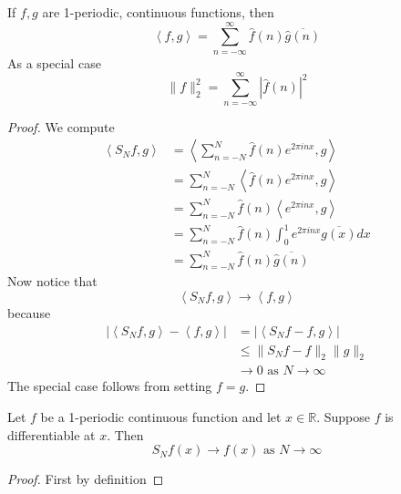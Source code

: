 \documentclass[11pt]{article}
\numberwithin{equation}{section}
\theoremstyle{definition}
\theoremstyle{definition}
\newcommand\angles[1]{\left\langle #1 \right\rangle}
\newcommand\abs[1]{\left| #1 \right|}
\newcommand\norm[1]{\lVert#1\rVert}
\newcommand{\1}{\mathbbm 1}
\newcommand{\RR}{\mathbb R}
\begin{document}
\begin{corollary}
	If $f,g$ are 1-periodic, continuous functions, then
	\begin{equation}
		\angles{f,g} = \sum_{n=-\infty}^\infty \hat{f}(n) \overline{\hat{g}(n)}
	\end{equation}
	As a special case
	\begin{equation}
		\norm{f}^2_2 = \sum_{n=-\infty}^\infty \abs{\hat{f}(n)}^2
	\end{equation}
\end{corollary}

\begin{proof}
	We compute
	\begin{align*}
		\angles{S_N f, g} &= \angles{\sum_{n=-N}^N \hat{f}(n) e^{2\pi i n x}, g} \\
		&= \sum_{n=-N}^N \angles{\hat{f}(n) e^{2\pi i n x}, g} \\
		&= \sum_{n=-N}^N \hat{f}(n) \angles{e^{2\pi i n x}, g} \\
		&= \sum_{n=-N}^N \hat{f}(n) \int_0^1 e^{2\pi i n x} \overline{g(x)} dx \\
		&= \sum_{n=-N}^N \hat{f}(n) \overline{\hat{g}(n)}
	\end{align*}
	Now notice that
	\begin{equation}
		\angles{S_N f, g} \to \angles{f,g}
	\end{equation}
	because
	\begin{align*}
		\abs{\angles{S_N f, g} - \angles{f,g}} &= \abs{\angles{S_N f - f, g}} \\
		&\leq \norm{S_N f - f}_2 \norm{g}_2 \tag{Cauchy-Schwarz} \\
		&\to 0 \text{ as } N \to \infty \tag{previous theorem} 
	\end{align*}
	The special case follows from setting $f=g$. 
\end{proof}


\begin{theorem}[]
	Let $f$ be a 1-periodic continuous function and let $x \in \RR$. Suppose $f$ is differentiable at $x$. Then 
	\begin{equation}
		S_N f(x) \to f(x) \text{ as } N \to \infty
	\end{equation}
\end{theorem}
\begin{proof}
	First by definition
\end{proof}
\end{document}
